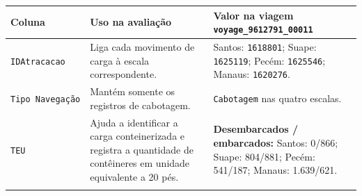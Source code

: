 \documentclass[brazil,]{article}
\begin{document}
\begin{longtable}[]{@{}lll@{}}
\toprule
\begin{minipage}[b]{0.30\columnwidth}\raggedright
Coluna\strut
\end{minipage} & \begin{minipage}[b]{0.30\columnwidth}\raggedright
Uso na avaliação\strut
\end{minipage} & \begin{minipage}[b]{0.30\columnwidth}\raggedright
Valor na viagem \texttt{voyage\_9612791\_00011}\strut
\end{minipage}\tabularnewline
\midrule
\endhead
\begin{minipage}[t]{0.30\columnwidth}\raggedright
\texttt{IDAtracacao}\strut
\end{minipage} & \begin{minipage}[t]{0.30\columnwidth}\raggedright
Liga cada movimento de carga à escala correspondente.\strut
\end{minipage} & \begin{minipage}[t]{0.30\columnwidth}\raggedright
Santos: \texttt{1618801}; Suape: \texttt{1625119}; Pecém:
\texttt{1625546}; Manaus: \texttt{1620276}.\strut
\end{minipage}\tabularnewline
\begin{minipage}[t]{0.30\columnwidth}\raggedright
\texttt{Tipo\ Navegação}\strut
\end{minipage} & \begin{minipage}[t]{0.30\columnwidth}\raggedright
Mantém somente os registros de cabotagem.\strut
\end{minipage} & \begin{minipage}[t]{0.30\columnwidth}\raggedright
\texttt{Cabotagem} nas quatro escalas.\strut
\end{minipage}\tabularnewline
\begin{minipage}[t]{0.30\columnwidth}\raggedright
\texttt{TEU}\strut
\end{minipage} & \begin{minipage}[t]{0.30\columnwidth}\raggedright
Ajuda a identificar a carga conteinerizada e registra a quantidade de
contêineres em unidade equivalente a 20 pés.\strut
\end{minipage} & \begin{minipage}[t]{0.30\columnwidth}\raggedright
\textbf{Desembarcados / embarcados:} Santos: 0/866; Suape: 804/881;
Pecém: 541/187; Manaus: 1.639/621.\strut
\end{minipage}\tabularnewline
\begin{minipage}[t]{0.30\columnwidth}\raggedright

\end{minipage}
\end{longtable}
\end{document}
